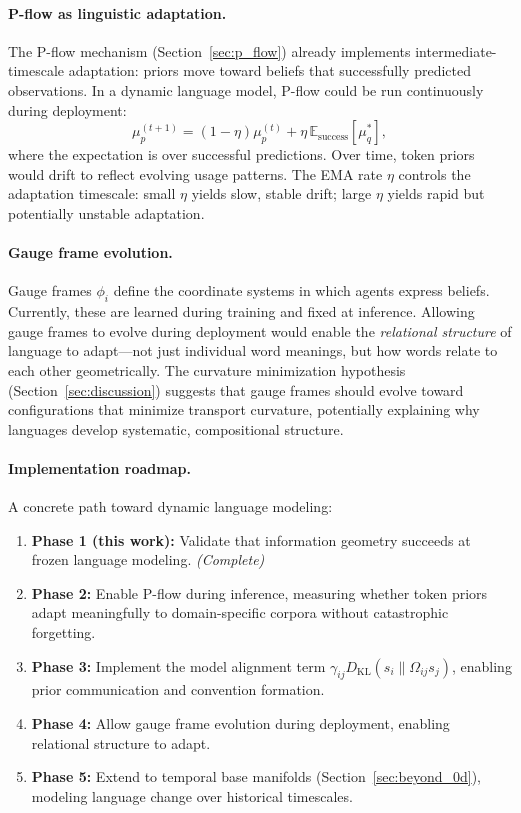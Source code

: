 \documentclass[twoside,11pt]{article}
\begin{document}
\paragraph{P-flow as linguistic adaptation.} The P-flow mechanism (Section~\ref{sec:p_flow}) already implements intermediate-timescale adaptation: priors move toward beliefs that successfully predicted observations. In a dynamic language model, P-flow could be run continuously during deployment:
%
\begin{equation}
\mu_p^{(t+1)} = (1 - \eta) \mu_p^{(t)} + \eta \, \mathbb{E}_{\text{success}}[\mu_q^*],
\end{equation}
%
where the expectation is over successful predictions. Over time, token priors would drift to reflect evolving usage patterns. The EMA rate $\eta$ controls the adaptation timescale: small $\eta$ yields slow, stable drift; large $\eta$ yields rapid but potentially unstable adaptation.

\paragraph{Gauge frame evolution.} Gauge frames $\phi_i$ define the coordinate systems in which agents express beliefs. Currently, these are learned during training and fixed at inference. Allowing gauge frames to evolve during deployment would enable the \emph{relational structure} of language to adapt---not just individual word meanings, but how words relate to each other geometrically. The curvature minimization hypothesis (Section~\ref{sec:discussion}) suggests that gauge frames should evolve toward configurations that minimize transport curvature, potentially explaining why languages develop systematic, compositional structure.

\paragraph{Implementation roadmap.} A concrete path toward dynamic language modeling:
\begin{enumerate}
    \item \textbf{Phase 1 (this work):} Validate that information geometry succeeds at frozen language modeling. \emph{(Complete)}
    \item \textbf{Phase 2:} Enable P-flow during inference, measuring whether token priors adapt meaningfully to domain-specific corpora without catastrophic forgetting.
    \item \textbf{Phase 3:} Implement the model alignment term $\gamma_{ij} D_{\mathrm{KL}}(s_i \| \Omega_{ij} s_j)$, enabling prior communication and convention formation.
    \item \textbf{Phase 4:} Allow gauge frame evolution during deployment, enabling relational structure to adapt.
    \item \textbf{Phase 5:} Extend to temporal base manifolds (Section~\ref{sec:beyond_0d}), modeling language change over historical timescales.
\end{enumerate}
\end{document}
